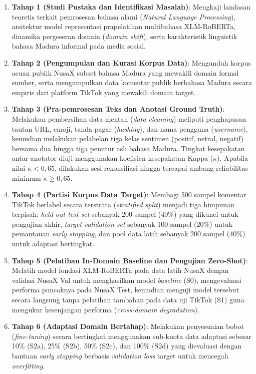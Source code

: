 \begin{enumerate}
    \item \textbf{Tahap 1 (Studi Pustaka dan Identifikasi Masalah)}: Mengkaji landasan teoretis terkait pemrosesan bahasa alami (\textit{Natural Language Processing}), arsitektur model representasi prapelatihan multibahasa XLM-RoBERTa, dinamika pergeseran domain (\textit{domain shift}), serta karakteristik linguistik bahasa Madura informal pada media sosial.
    \item \textbf{Tahap 2 (Pengumpulan dan Kurasi Korpus Data)}: Mengunduh korpus acuan publik NusaX subset bahasa Madura yang mewakili domain formal sumber, serta mengumpulkan data komentar publik berbahasa Madura secara empiris dari platform TikTok yang mewakili domain target.
    \item \textbf{Tahap 3 (Pra-pemrosesan Teks dan Anotasi Ground Truth)}: Melakukan pembersihan data mentah (\textit{data cleaning}) meliputi penghapusan tautan URL, emoji, tanda pagar (\textit{hashtag}), dan nama pengguna (\textit{username}), kemudian melakukan pelabelan tiga kelas sentimen (positif, netral, negatif) bersama dua hingga tiga penutur asli bahasa Madura. Tingkat kesepakatan antar-anotator diuji menggunakan koefisien kesepakatan Kappa ($\kappa$). Apabila nilai $\kappa < 0{,}65$, dilakukan sesi rekonsiliasi hingga tercapai ambang reliabilitas minimum $\kappa \ge 0{,}65$.
    \item \textbf{Tahap 4 (Partisi Korpus Data Target)}: Membagi 500 sampel komentar TikTok berlabel secara terstrata (\textit{stratified split}) menjadi tiga himpunan terpisah: \textit{held-out test set} sebanyak 200 sampel (40\%) yang dikunci untuk pengujian akhir, \textit{target validation set} sebanyak 100 sampel (20\%) untuk pemantauan \textit{early stopping}, dan pool data latih sebanyak 200 sampel (40\%) untuk adaptasi bertingkat.
    \item \textbf{Tahap 5 (Pelatihan In-Domain Baseline dan Pengujian Zero-Shot)}: Melatih model fondasi XLM-RoBERTa pada data latih NusaX dengan validasi NusaX Val untuk menghasilkan model \textit{baseline} (S0), mengevaluasi performa puncaknya pada NusaX Test, kemudian menguji model tersebut secara langsung tanpa pelatihan tambahan pada data uji TikTok (S1) guna mengukur kesenjangan performa (\textit{cross-domain degradation}).
    \item \textbf{Tahap 6 (Adaptasi Domain Bertahap)}: Melakukan penyesuaian bobot (\textit{fine-tuning}) secara bertingkat menggunakan sub-kuota data adaptasi sebesar 10\% (S2a), 25\% (S2b), 50\% (S2c), dan 100\% (S2d) yang dievaluasi dengan bantuan \textit{early stopping} berbasis \textit{validation loss} target untuk mencegah \textit{overfitting}.

\end{enumerate}
